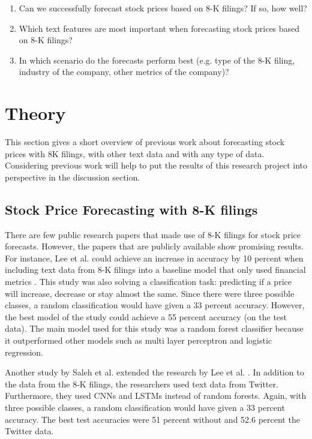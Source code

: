 \documentclass{article}
\begin{document}
	\begin{enumerate}
		\item Can we successfully forecast stock prices based on 8-K filings? If so, how well?
		\item Which text features are most important when forecasting stock prices based on 8-K filings?
		\item In which scenario do the forecasts perform best (e.g. type of the 8-K filing, industry of the company, other metrics of the company)?
	\end{enumerate}
	

	\section{Theory}
	
	This section gives a short overview of previous work about forecasting stock prices with 8K filings, with other text data and with any type of data. Considering previous work will help to put the results of this research project into perspective in the discussion section.
	
	\subsection{Stock Price Forecasting with 8-K filings}
	
	There are few public research papers that made use of 8-K filings for stock price forecasts. However, the papers that are publicly available show promising results. For instance, Lee et al. could achieve an increase in accuracy by 10 percent when including text data from 8-K filings into a baseline model that only used financial metrics \cite{lee_importance_2014}. This study was also solving a classification task: predicting if a price will increase, decrease or stay almost the same. Since there were three possible classes, a random classification would have given a 33 percent accuracy. However, the best model of the study could achieve a 55 percent accuracy (on the test data). The main model used for this study was a random forest classifier because it outperformed other models such as multi layer perceptron and logistic regression.
	
	Another study by Saleh et al. extended the research by Lee et al. \cite{saleh_neural_nodate}. In addition to the data from the 8-K filings, the researchers used text data from Twitter. Furthermore, they used CNNs and LSTMs instead of random forests. Again, with three possible classes, a random classification would have given a 33 percent accuracy. The best test accuracies were 51 percent without and 52.6 percent the Twitter data.
	
\end{document}
